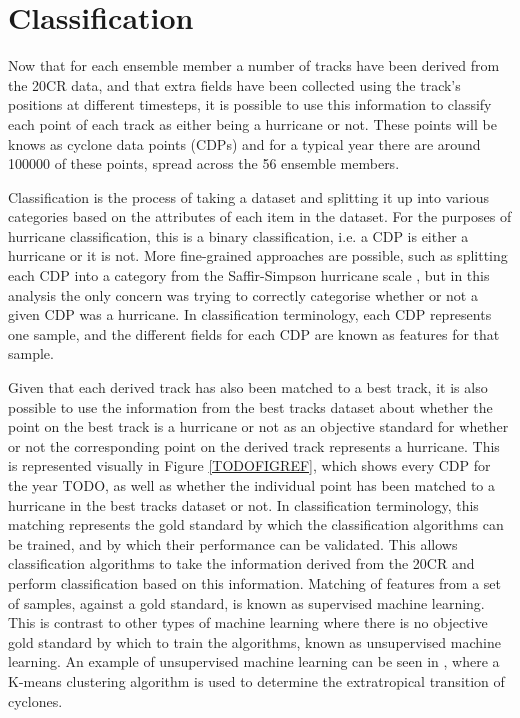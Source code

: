 \documentclass[pdftex,12pt,a4paper]{report}
\begin{document}



\section{Classification}
\label{sec:classification}

Now that for each ensemble member a number of tracks have been derived from the 20CR data, and that
extra fields have been collected using the track's positions at different timesteps, it is possible
to use this information to classify each point of each track as either being a hurricane or not.
These points will be knows as cyclone data points (CDPs) and for a typical year there are around
100000 of these points, spread across the 56 ensemble members.

Classification is the process of taking a dataset and splitting it up into various categories based
on the attributes of each item in the dataset. For the purposes of hurricane classification, this is
a binary classification, i.e. a CDP is either a hurricane or it is not. More fine-grained approaches
are possible, such as splitting each CDP into a category from the Saffir-Simpson hurricane scale
\parencite{simpson1974hurricane}, but in this analysis the only concern was trying to correctly categorise whether or
not a given CDP was a hurricane. In classification terminology, each CDP represents one sample, and
the different fields for each CDP are known as features for that sample.

Given that each derived track has also been matched to a best track, it is also possible to use the
information from the best tracks dataset about whether the point on the best track is a hurricane or
not as an objective standard for whether or not the corresponding point on the derived track
represents a hurricane. This is represented visually in Figure \ref{TODOFIGREF}, which shows every
CDP for the year TODO, as well as whether the individual point has been matched to a hurricane in
the best tracks dataset or not. In classification terminology, this matching represents the gold
standard by which the classification algorithms can be trained, and by which their performance can
be validated. This allows classification algorithms to take the information derived from the 20CR
and perform classification based on this information. Matching of features from a set of samples,
against a gold standard, is known as supervised machine learning. This is contrast to other types of
machine learning where there is no objective gold standard by which to train the algorithms, known
as unsupervised machine learning. An example of unsupervised machine learning can be seen in
\textcite{studholme2014objective}, where a K-means clustering algorithm is used to determine the
extratropical transition of cyclones.
\end{document}
